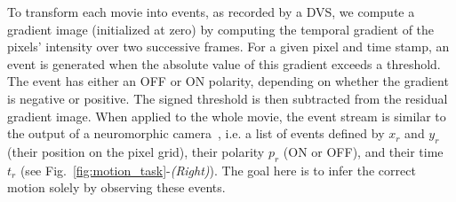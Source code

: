 \documentclass[default]{sn-jnl}%
\theoremstyle{thmstyleone}%
\theoremstyle{thmstyletwo}%
\theoremstyle{thmstylethree}%
\newcommand{\seeFig}[1]{see Fig.~\ref{fig:#1}}%
\newcommand{\arank}{r} %
\newcommand{\timev}{t} %
\newcommand{\polev}{p} %
\begin{document}
To transform each movie into events, as recorded by a DVS, we compute a gradient image (initialized at zero) by computing the temporal gradient of the pixels' intensity over two successive frames. For a given pixel and time stamp, an event is generated when the absolute value of this gradient exceeds a threshold. The event has either an OFF or ON polarity, depending on whether the gradient is negative or positive. The signed threshold is then subtracted from the residual gradient image. When applied to the whole movie, the event stream is similar to the output of a neuromorphic camera~\citep{rasetto_challenges_2022}, i.e. a list of events defined by $x_\arank$ and $y_\arank$ (their position on the pixel grid), their polarity $\polev_\arank$ (ON or OFF), and their time $\timev_\arank$ (\seeFig{motion_task}-\textit{(Right)}). The goal here is to infer the correct motion solely by observing these events.%
\end{document}
